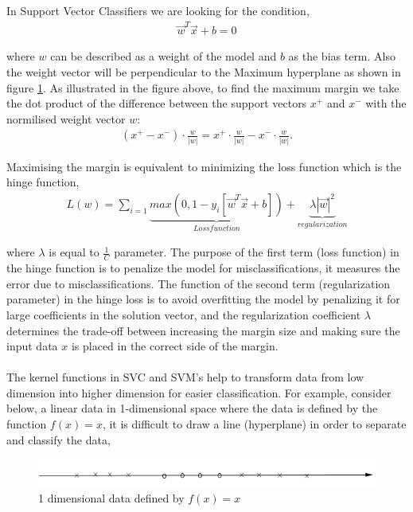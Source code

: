 \documentclass[12pt,a4paper]{article}
\begin{document}
\noindent In Support Vector Classifiers we are looking for the condition,
\begin{align}
\vec{w}^T\vec{x}+b=0
\end{align}

\noindent where $w$ can be described as a weight of the model and $b$ as the bias term. Also the weight vector will be perpendicular to the Maximum hyperplane as shown in figure \ref{fig:svm}.  As illustrated in the figure above, to find the maximum margin we take the dot product of the difference between the support vectors $x^+$ and $x^-$ with the normilised weight vector $w$:
\begin{align}
(x^+-x^-)\cdot \frac{w}{|w|}=x^+\cdot\frac{w}{|w|}-x^-\cdot\frac{w}{|w|}.
\end{align}

\noindent Maximising the margin is equivalent to minimizing the loss function which is the hinge function,
\begin{align}
L(w)=\sum_{i=1}\underbrace{max(0,1-y_i[\vec{w}^T\vec{x}+b])}_{Loss function}+\underbrace{\lambda|\vec{w}|^2}_{regularization}
\end{align}

\noindent where $\lambda$ is equal to $\frac{1}{C}$ parameter. The purpose of the first term (loss function) in the hinge function is to penalize the model for misclassifications, it measures the error due to misclassifications. The function of the second term (regularization parameter) in the hinge loss is to avoid overfitting the model by penalizing it for large coefficients in the solution vector, and the regularization coefficient $\lambda$  determines the trade-off between increasing the margin size and making sure the input data $x$ is placed in the correct side of the margin.\\
\\
\noindent The kernel functions in SVC and SVM's help to transform data from low dimension into higher dimension for easier classification. For example, consider below, a linear data in 1-dimensional space where the data is defined by the function $f(x)=x$, it is difficult to draw a line (hyperplane) in order to separate and classify the  data,


\begin{figure}[h!]
\label{fig:svm}
\centering
\includegraphics[scale=0.55]{svm_2}
\caption{1 dimensional data defined by $f(x)=x$}
\centering
\end{figure}
\end{document}
